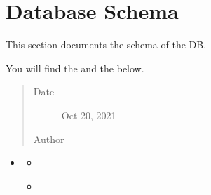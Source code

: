 \documentclass[letterpaper,10pt,english]{sphinxmanual}
\begin{document}
\chapter{Database Schema}
\label{\detokenize{database_schema:database-schema}}\label{\detokenize{database_schema:id1}}\label{\detokenize{database_schema::doc}}
\begin{sphinxShadowBox}

\sphinxAtStartPar
This section documents the schema of the DB.

\sphinxAtStartPar
You will find the {\hyperref[\detokenize{database_schema:schema-definitions}]{}} and the {\hyperref[\detokenize{database_schema:reference-tables}]{}} below.
\begin{quote}\begin{description}
\item[{Date}] \leavevmode
\sphinxAtStartPar
Oct 20, 2021

\item[{Author}] \leavevmode
\sphinxAtStartPar
{}

\end{description}\end{quote}
\end{sphinxShadowBox}

\begin{sphinxShadowBox}
\begin{itemize}
\item {} 
\sphinxAtStartPar
{}\label{\detokenize{database_schema:id99}}{\hyperref[\detokenize{database_schema:database-schema}]{}}
\begin{itemize}
\item {} 
\sphinxAtStartPar
{}\label{\detokenize{database_schema:id100}}{\hyperref[\detokenize{database_schema:schema-definitions}]{}}

\item {} 
\sphinxAtStartPar
{}\label{\detokenize{database_schema:id101}}{\hyperref[\detokenize{database_schema:reference-tables}]{}}

\end{itemize}

\end{itemize}
\end{sphinxShadowBox}
\end{document}

